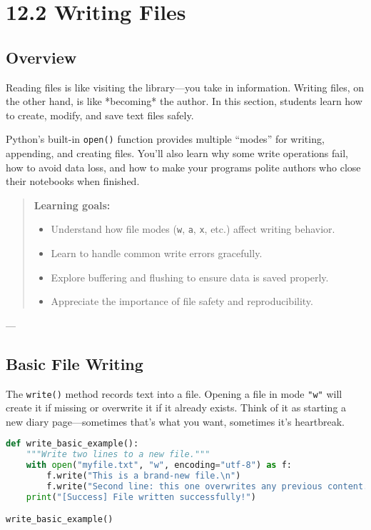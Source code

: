 \chapter{12.2 Writing Files}

\section*{Overview}

Reading files is like visiting the library---you take in information.  
Writing files, on the other hand, is like *becoming* the author.  
In this section, students learn how to create, modify, and save text files safely.  

Python’s built-in \texttt{open()} function provides multiple “modes” for writing, appending, and creating files.  
You’ll also learn why some write operations fail, how to avoid data loss, and how to make your programs polite authors who close their notebooks when finished.

\begin{quote}
\textbf{Learning goals:}
\begin{itemize}
  \item Understand how file modes (\texttt{w}, \texttt{a}, \texttt{x}, etc.) affect writing behavior.
  \item Learn to handle common write errors gracefully.
  \item Explore buffering and flushing to ensure data is saved properly.
  \item Appreciate the importance of file safety and reproducibility.
\end{itemize}
\end{quote}

---

\section{Basic File Writing}

The \texttt{write()} method records text into a file.  
Opening a file in mode \texttt{"w"} will create it if missing or overwrite it if it already exists.  
Think of it as starting a new diary page—sometimes that’s what you want, sometimes it’s heartbreak.

\begin{lstlisting}[language=Python, caption={Example 1: Writing text to a file.}]
def write_basic_example():
    """Write two lines to a new file."""
    with open("myfile.txt", "w", encoding="utf-8") as f:
        f.write("This is a brand-new file.\n")
        f.write("Second line: this one overwrites any previous content.\n")
    print("[Success] File written successfully!")

write_basic_example()
\end{lstlisting}

